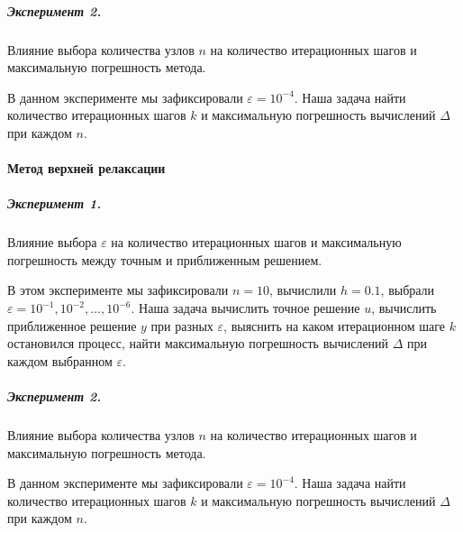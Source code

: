 \subparagraph{Эксперимент 2.}

Влияние выбора количества узлов $n$ на количество итерационных шагов и максимальную погрешность метода.

В данном эксперименте мы зафиксировали $\varepsilon = 10^{-4}$. Наша задача найти количество итерационных шагов $k$ и максимальную погрешность вычислений $\Delta$ при каждом $n$.



\newpage
\paragraph{Метод верхней релаксации}

\subparagraph{Эксперимент 1.}

Влияние выбора $\varepsilon$ на количество итерационных шагов и максимальную погрешность между точным и приближенным решением.

В этом эксперименте мы зафиксировали $n = 10$, вычислили $h=0.1$, выбрали $\varepsilon = 10^{-1}, 10^{-2}, \dots, 10^{-6}$. Наша задача вычислить точное решение $u$, вычислить приближенное решение $y$ при разных $\varepsilon$, выяснить на каком итерационном шаге $k$  остановился процесс, найти максимальную погрешность вычислений $\Delta$ при каждом выбранном $\varepsilon$.



\subparagraph{Эксперимент 2.}

Влияние выбора количества узлов $n$ на количество итерационных шагов и максимальную погрешность метода.

В данном эксперименте мы зафиксировали $\varepsilon = 10^{-4}$. Наша задача найти количество итерационных шагов $k$ и максимальную погрешность вычислений $\Delta$ при каждом $n$.

